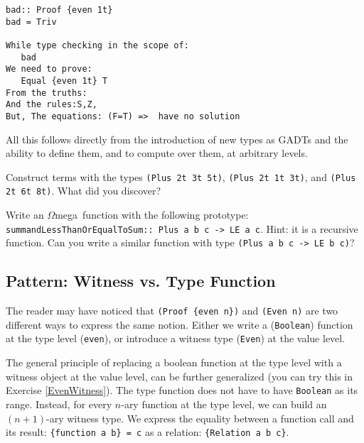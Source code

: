 \documentclass[11pt,twoside,A4]{llncs}
\newcommand{\om}{\emph{$\Omega$}mega}
\begin{document}
{\small
\begin{verbatim}
bad:: Proof {even 1t}
bad = Triv

While type checking in the scope of:
   bad
We need to prove:
   Equal {even 1t} T
From the truths:
And the rules:S,Z,
But, The equations: (F=T) =>  have no solution
\end{verbatim}}

All this follows directly from the introduction of new types as GADTs
and the ability to define them, and to compute over them, at arbitrary levels. 

\begin{exercise} 
Construct terms with the types {\tt (Plus 2t 3t 5t)}, {\tt (Plus 2t 1t 3t)},
and {\tt (Plus 2t 6t 8t)}. What did you discover?
\end{exercise}

\begin{exercise} \label{summand}
Write an \om\ function with the following prototype:\\
{\tt summandLessThanOrEqualToSum:: Plus a b c -> LE a c}. Hint: it is a recursive function.
Can you write a similar function with type {\tt (Plus a b c -> LE b c)}?
\end{exercise}

\subsection{Pattern: Witness vs. Type Function}
The reader may have noticed that {\tt (Proof \{even n\})} and {\tt (Even n)} are
two different ways to express the same notion.
Either we write a ({\tt Boolean}) function at the type level ({\tt even}), or
introduce a witness type ({\tt Even}) at the value level. 

The general principle of replacing a boolean function at the type level
with a witness object at the value level, can be further
generalized (you can try this in Exercise \ref{EvenWitness}).
The type function does not
have to have {\tt Boolean} as its range. Instead, 
for every $n$-ary function at the type
level, we can build an $(n+1)$-ary witness type. 
We express the equality between a function call and its
result: {\tt \{function a b\} = c} as a relation: {\tt \{Relation a b c\}}.
\end{document}
